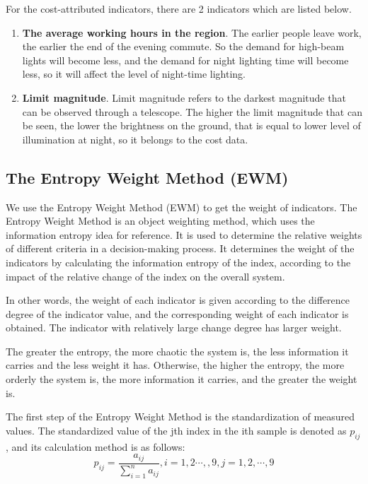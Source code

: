 For the cost-attributed indicators, there are 2 indicators which are listed below.
\begin{enumerate}
    \item \textbf{The average working hours in the region}. The earlier people leave work, the earlier the end of the evening commute. So the demand for high-beam lights will become less, and the demand for night lighting time will become less, so it will affect the level of night-time lighting.
    
    \item \textbf{Limit magnitude}. Limit magnitude refers to the darkest magnitude that can be observed through a telescope. The higher the limit magnitude that can be seen, the lower the brightness on the ground, that is equal to lower level of illumination at night, so it belongs to the cost data.
\end{enumerate}



\subsection{The Entropy Weight Method (EWM) }
We use the Entropy Weight Method (EWM) to get the weight of indicators. The Entropy Weight Method is an object weighting method, which uses the information entropy idea for reference. It is used to determine the relative weights of different criteria in a decision-making process. It determines the weight of the indicators by calculating the information entropy of the index, according to the impact of the relative change of the index on the overall system.

In other words, the weight of each indicator is given according to the difference degree of the indicator value, and the corresponding weight of each indicator is obtained. The indicator with relatively large change degree has larger weight. 

The greater the entropy, the more chaotic the system is, the less information it carries and the less weight it has. Otherwise, the higher the entropy, the more orderly the system is, the more information it carries, and the greater the weight is.

The first step of the Entropy Weight Method is the standardization of measured values. The standardized value of the jth index in the ith sample is denoted as $p_{ij}$, and its calculation method is as follows:$$p_{ij}=\frac{a_{ij}}{\sum_{i=1}^na_{ij}},i=1,2\cdots,,9,j=1,2,\cdots,9$$

